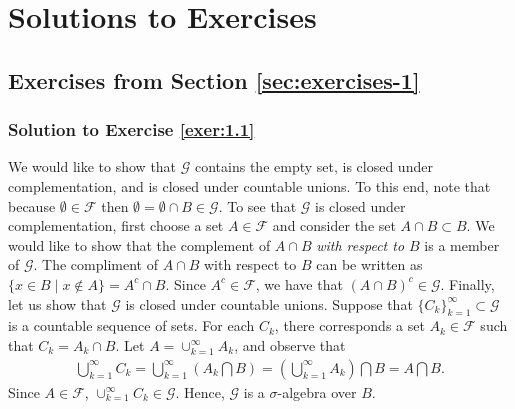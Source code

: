 \documentclass[12pt]{book}
\numberwithin{equation}{chapter}
\theoremstyle{plain}
\numberwithin{theorem}{section}
\theoremstyle{definition}
\numberwithin{exercise}{chapter}
\newcommand{\<}{\langle}
\renewcommand{\>}{\rangle}
\renewcommand{\(}{\left(}
\renewcommand{\)}{\right)}
\renewcommand{\[}{\left[}
\renewcommand{\]}{\right]}
\newcommand\Fc{\mathscr{F}}
\newcommand\Gc{\mathscr{G}}
\newcommand\sig{\sigma}
\begin{document}
%
% 



%
%

\appendix

%
%

\chapter{Solutions to Exercises}


\section{Exercises from Section \ref{sec:exercises-1}}

\subsection*{Solution to Exercise \ref{exer:1.1}}
We would like to show that $\Gc$ contains the empty set, is closed under complementation, and is closed under countable unions. To this end, note that because $\emptyset \in \Fc$ then $\emptyset = \emptyset \cap B \in \Gc$. To see that $\Gc$ is closed under complementation, first choose a set $A \in \Fc$ and consider the set $A \cap B \subset B$. We would like to show that the complement of $A \cap B$ \textit{with respect to $B$} is a member of $\Gc$. The compliment of $A \cap B$ with respect to $B$ can be written as $\{ x \in B \mid x \not\in A \}= A^c \cap B.$ Since $A^c \in \Fc$, we have that $(A \cap B)^c \in \Gc$. Finally, let us show that $\Gc$ is closed under countable unions. Suppose that $\{ C_k \}_{k=1}^\infty \subset \Gc$ is a countable sequence of sets. For each $C_k$, there corresponds a set $A_k \in \Fc$ such that $C_k = A_k \cap B$. Let $A = \cup_{k=1}^\infty A_k$, and observe that
\begin{align}
\bigcup_{k=1}^\infty C_k 
	= \bigcup_{k = 1}^\infty \( A_k \bigcap B \) 
	= \( \bigcup_{k=1}^\infty A_k \) \bigcap B
	= A \bigcap B.
\end{align}
Since $A \in \Fc$, $\cup_{k=1}^\infty C_k \in \Gc$. Hence, $\Gc$ is a $\sig$-algebra over $B$. 
\end{document}
